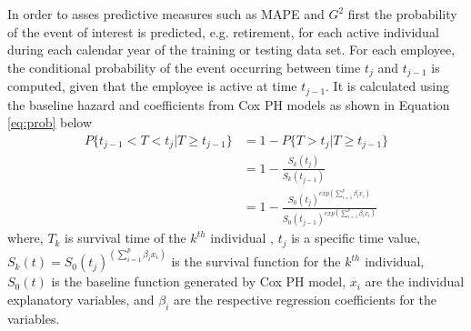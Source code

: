 In order to asses predictive measures such as MAPE and $G^2$ first the probability of the event of interest is predicted, e.g. retirement, for each active individual during each calendar year of the training or testing data set. For each employee, the conditional probability of the event occurring between time $t_j$ and $t_{j-1}$ is computed, given that the employee is active at time $t_{j-1}$. It is calculated using the baseline hazard and coefficients from Cox PH models as shown in Equation \ref{eq:prob} below
\begin{equation}
\label{eq:prob}
\begin{split}%
P\{t_{j-1}<T<t_j|T \ge t_{j-1}\} &=1-P\{T>t_j|T \ge t_{j-1}\}\\
&=1-\frac{S_k(t_j)}{S_k{(t_{j-1})}}   \\
&=1-\frac{{S_0(t_j)}^{exp(\sum_{i=1}^{p}\beta_ix_i)}}{   {S_0(t_{j-1})}^{exp(\sum_{i=1}^{p}\beta_ix_i)}}
\end{split}
\end{equation}
where, $T_k$ is survival time of the $k^{th}$ individual , $t_j$ is a specific time value, $S_k(t) = {S_0(t_j)}^{(\sum_{i=1}^{p}\beta_ix_i)}$ is the survival function for the $k^{th}$ individual, $S_0(t)$ is the baseline function generated by Cox PH model, $x_i$ are the individual explanatory variables, and $\beta_i$ are the respective regression coefficients for the variables.

